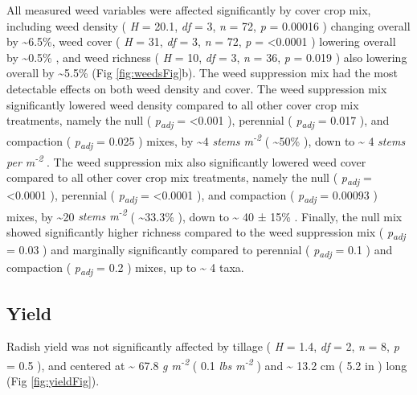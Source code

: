\documentclass[
  12pt,
]{article}
\begin{document}
All measured weed variables were affected significantly by cover crop mix, including
weed density (
\emph{H} = 20.1,
\emph{df} = 3,
\emph{n} = 72,
\emph{p} = 0.00016
) changing overall by
\textasciitilde6.5\%,
weed cover (
\emph{H} = 31,
\emph{df} = 3,
\emph{n} = 72,
\emph{p} = \textless0.0001
) lowering overall by
\textasciitilde0.5\%
, and
weed richness (
\emph{H} = 10,
\emph{df} = 3,
\emph{n} = 36,
\emph{p} = 0.019
) also lowering overall by
\textasciitilde5.5\%
(Fig \ref{fig:weedsFig}b).
The weed suppression mix had the most detectable effects on both weed density and cover.
The weed suppression mix significantly lowered weed density compared to all other cover crop mix treatments, namely the null (
\emph{p\textsubscript{adj}} = \textless0.001
), perennial (
\emph{p\textsubscript{adj}} = 0.017
), and compaction (
\emph{p\textsubscript{adj}} = 0.025
) mixes, by
\textasciitilde4 \emph{stems m\textsuperscript{-2}} (
\textasciitilde50\%
), down to
\textasciitilde{} 4
\emph{stems per m\textsuperscript{-2}}
.
The weed suppression mix also significantly lowered weed cover compared to all other cover crop mix treatments, namely the null (
\emph{p\textsubscript{adj}} = \textless0.0001
), perennial (
\emph{p\textsubscript{adj}} = \textless0.0001
), and compaction (
\emph{p\textsubscript{adj}} = 0.00093
) mixes, by
\textasciitilde20 \emph{stems m\textsuperscript{-2}} (
\textasciitilde33.3\%
), down to
\textasciitilde{} 40 ±
15\%
.
Finally, the null mix showed significantly higher richness compared to the weed suppression mix (
\emph{p\textsubscript{adj}} = 0.03
) and marginally significantly compared to perennial (
\emph{p\textsubscript{adj}} = 0.1
) and compaction (
\emph{p\textsubscript{adj}} = 0.2
) mixes,
up to
\textasciitilde{} 4
taxa.

\hypertarget{yield}{%
\subsection{Yield}\label{yield}}

Radish yield was not significantly affected by tillage (
\emph{H} = 1.4,
\emph{df} = 2,
\emph{n} = 8,
\emph{p} = 0.5
), and centered at
\textasciitilde{} 67.8
\emph{g m\textsuperscript{-2}}
(
0.1
\emph{lbs m\textsuperscript{-2}}
) and
\textasciitilde{} 13.2 cm
(
5.2 in
)
long (Fig \ref{fig:yieldFig}).
\end{document}
